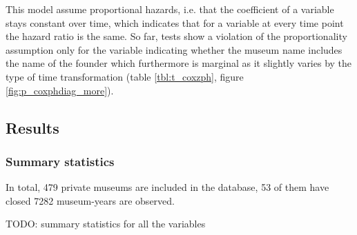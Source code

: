 \documentclass[11pt]{article}
\begin{document}
This model assume proportional hazards, i.e. that the coefficient of a variable stays constant over time, which indicates that for a variable at every time point the hazard ratio is the same.
So far, tests show a violation of the proportionality assumption only for the variable indicating whether the museum name includes the name of the founder  which furthermore is marginal as it slightly varies by the type of time transformation (table \ref{tbl:t_coxzph}, figure \ref{fig:p_coxphdiag_more}).


\subsection*{Results}


\subsubsection*{Summary statistics}


In total, 479 private museums are included in the database, 53 of them have closed
7282 museum-years are observed.

\noindent
TODO: summary statistics for all the variables
\end{document}
